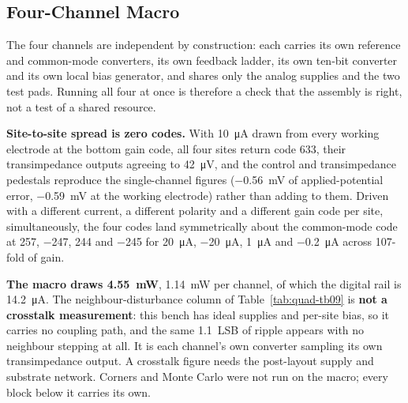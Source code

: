 \subsection{Four-Channel Macro}\label{ss:quad}

The four channels are independent by construction: each carries its own
reference and common-mode converters, its own feedback ladder, its own
ten-bit converter and its own local bias generator, and shares only the analog
supplies and the two test pads. Running all four at once is therefore a check
that the assembly is right, not a test of a shared resource.

\textbf{Site-to-site spread is zero codes.} With \SI{10}{\micro\ampere} drawn
from every working electrode at the bottom gain code, all four sites return code
\num{633}, their transimpedance outputs agreeing to \SI{42}{\micro\volt}, and
the control and transimpedance pedestals reproduce the single-channel figures
(\SI{-0.56}{\milli\volt} of applied-potential error, \SI{-0.59}{\milli\volt} at
the working electrode) rather than adding to them. Driven with a different
current, a different polarity and a different gain code per site,
simultaneously, the four codes land symmetrically about the common-mode code at
\num{+257}, \num{-247}, \num{+244} and \num{-245} for \SI{+20}{\micro\ampere},
\SI{-20}{\micro\ampere}, \SI{+1}{\micro\ampere} and
\SI{-0.2}{\micro\ampere} across \num{107}-fold of gain.

\textbf{The macro draws \SI{4.55}{\milli\watt}}, \SI{1.14}{\milli\watt} per
channel, of which the digital rail is \SI{14.2}{\micro\ampere}. The
neighbour-disturbance column of Table~\ref{tab:quad-tb09} is
\textbf{not a crosstalk measurement}: this bench has ideal supplies and per-site
bias, so it carries no coupling path, and the same \SI{1.1}{LSB} of ripple
appears with no neighbour stepping at all. It is each channel's own converter
sampling its own transimpedance output. A crosstalk figure needs the
post-layout supply and substrate network. Corners and Monte Carlo were not run
on the macro; every block below it carries its own.



